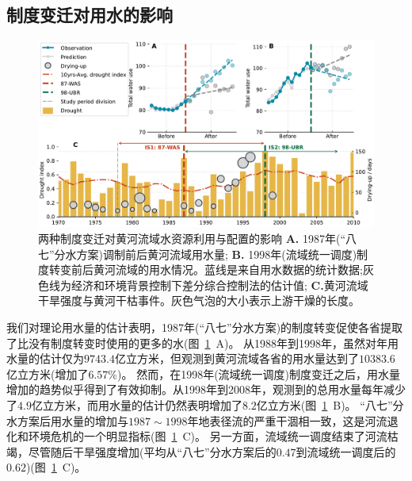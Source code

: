 

\subsection{制度变迁对用水的影响}
\label{result-2}

\begin{figure}[!htb]
	\centering
	\includegraphics[width=\linewidth]{img/ch5/main_results2.pdf}
	\caption[两种制度变迁对黄河流域水资源利用与配置的影响]{
        两种制度变迁对黄河流域水资源利用与配置的影响
        \textbf{A.} 1987年(“八七”分水方案)调制前后黄河流域用水量;
        \textbf{B.} 1998年(流域统一调度)制度转变前后黄河流域的用水情况。蓝线是来自用水数据的统计数据;灰色线为经济和环境背景控制下差分综合控制法的估计值;
        \textbf{C.}黄河流域干旱强度与黄河干枯事件。灰色气泡的大小表示上游干燥的长度。
	}\label{fig:main_results}
\end{figure}


\label{result-1-p2}
我们对理论用水量的估计表明，1987年(“八七”分水方案)的制度转变促使各省提取了比没有制度转变时使用的更多的水(图~\ref{fig:main_results}~A)。
从1988年到1998年，虽然对年用水量的估计仅为$9743.4$亿立方米，但观测到黄河流域各省的用水量达到了$10383.6$亿立方米(增加了$6.57\%$)。
然而，在1998年(流域统一调度)制度变迁之后，用水量增加的趋势似乎得到了有效抑制。从1998年到2008年，观测到的总用水量每年减少了$4.9$亿立方米，而用水量的估计仍然表明增加了$8.2$亿立方米(图~\ref{fig:main_results}~B)。
“八七”分水方案后用水量的增加与$1987 \sim 1998$年地表径流的严重干涸相一致，这是河流退化和环境危机的一个明显指标(图~\ref{fig:main_results}~C)。
另一方面，流域统一调度结束了河流枯竭，尽管随后干旱强度增加(平均从“八七”分水方案后的$0.47$到流域统一调度后的$0.62$)(图~\ref{fig:main_results}~C)。

